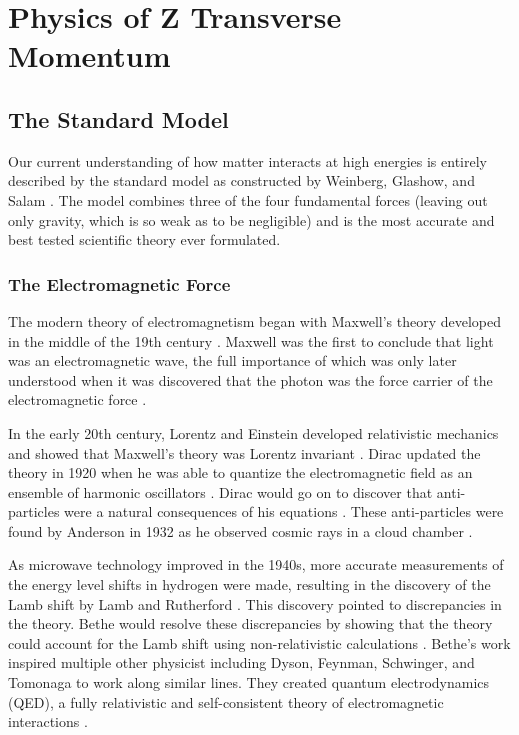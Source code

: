 \chapter{Physics of Z Transverse Momentum}
\label{chapter:theory}

\section{The Standard Model}
\label{section:standard_model}

Our current understanding of how matter interacts at high energies is entirely
described by the standard model as constructed by Weinberg, Glashow, and
Salam \cite{glashow1961}\cite{weinberg1967}\cite{salam1968}. The model combines
three of the four fundamental forces (leaving out only gravity, which is so
weak as to be negligible) and is the most accurate and best tested scientific
theory ever formulated.

\subsection{The Electromagnetic Force}
\label{subsection:electronmagnetic_force}

The modern theory of electromagnetism began with Maxwell's theory developed in
the middle of the 19th century \cite{maxwell1873}. Maxwell was the first to
conclude that light was an electromagnetic wave, the full importance of which
was only later understood when it was discovered that the photon was the force
carrier of the electromagnetic force \cite{maxwell1865}.

In the early 20th century, Lorentz and Einstein developed relativistic
mechanics and showed that Maxwell's theory was Lorentz invariant
\cite{lorentz1899}\cite{einstein1904}. Dirac updated the theory in 1920 when he
was able to quantize the electromagnetic field as an ensemble of harmonic
oscillators \cite{dirac1927}. Dirac would go on to discover that anti-particles
were a natural consequences of his equations \cite{dirac1928}\cite{dirac1930}.
These anti-particles were found by Anderson in 1932 as he observed cosmic rays
in a cloud chamber \cite{anderson1933}.

As microwave technology improved in the 1940s, more accurate measurements of
the energy level shifts in hydrogen were made, resulting in the discovery of
the Lamb shift by Lamb and Rutherford \cite{lamb1947}. This discovery pointed
to discrepancies in the theory. Bethe would resolve these discrepancies by
showing that the theory could account for the Lamb shift using non-relativistic
calculations \cite{bethe1947}. Bethe's work inspired multiple other physicist
including Dyson, Feynman, Schwinger, and Tomonaga to work along similar lines.
They created quantum electrodynamics (QED), a fully relativistic and
self-consistent theory of electromagnetic interactions
\cite{tomonaga1946}\cite{schwinger1948}\cite{feynman1949}\cite{dyson1949}.

